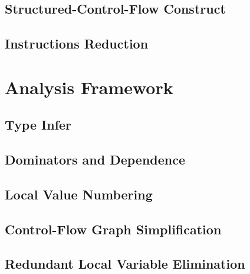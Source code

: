 \subsection{Structured-Control-Flow Construct}

\subsection{Instructions Reduction}

\section{Analysis Framework}

\subsection{Type Infer}

\subsection{Dominators and Dependence}

\subsection{Local Value Numbering}

\subsection{Control-Flow Graph Simplification}

\subsection{Redundant Local Variable Elimination}